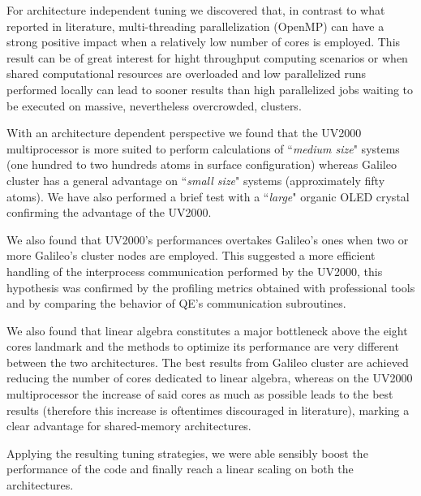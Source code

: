 \documentclass[a4paper,10pt]{article}
\begin{document}
For architecture independent tuning we discovered that, in contrast to what reported in literature, multi-threading parallelization (OpenMP) can have a strong positive impact when a relatively low number of cores is employed.
This result can be of great interest for hight throughput computing scenarios or when shared computational resources are overloaded and low parallelized runs performed locally can lead to sooner results than high parallelized jobs waiting to be executed on massive, nevertheless overcrowded, clusters.

With an architecture dependent perspective we found that the UV2000 multiprocessor is more suited to perform calculations of ``\textit{medium size}" systems\cite{Titania1}\cite{prace} (one hundred to two hundreds atoms in surface configuration) whereas Galileo cluster has a general advantage on ``\textit{small size}" systems (approximately fifty atoms).
We have also performed a brief test with a ``\textit{large}" organic OLED crystal confirming the advantage of the UV2000.

We also found that UV2000's performances overtakes Galileo's ones when two or more Galileo's cluster nodes are employed.
This suggested a more efficient handling of the interprocess communication performed by the UV2000, this hypothesis was confirmed by the profiling metrics obtained with professional tools and by comparing the behavior of QE's communication subroutines.

We also found that linear algebra constitutes a major bottleneck above the eight cores landmark and the methods to optimize its performance are very different between the two architectures.
The best results from Galileo cluster are achieved reducing the number of cores dedicated to linear algebra, whereas on the UV2000 multiprocessor the increase of said cores as much as possible leads to the best results (therefore this increase is  oftentimes discouraged in literature\cite{QE2}), marking a clear advantage for shared-memory architectures.

Applying the resulting tuning strategies, we were able sensibly boost the performance of the code and finally reach a linear scaling on both the architectures.
\end{document}
